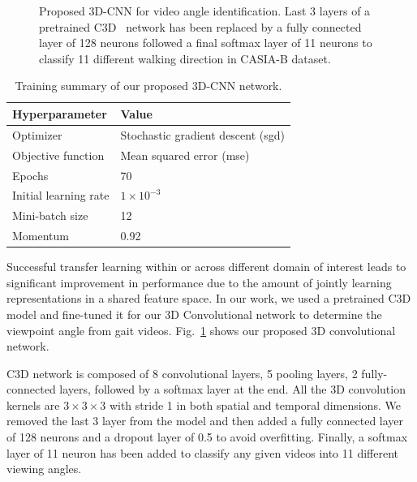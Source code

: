 \begin{figure}
	\caption{
		Proposed 3D-CNN for video angle identification. Last 3 layers of a pretrained C3D~\cite{Tran_15} network has been replaced by a fully connected layer of 128 neurons followed a final softmax layer of 11 neurons to classify 11 different walking direction in CASIA-B dataset.
	}
	\label{fig:3D_CNN}
\end{figure}

\begin{table}
	\centering
	\caption{Training summary of our proposed 3D-CNN network.  \label{table:summary_3dcnn}}
	\begin{tabular*}{30pc}{@{\extracolsep{\fill}}ll@{}}
			\hline \noalign{\vspace{3pt}}
			\textbf{Hyperparameter} & \textbf{Value} \\ \hline\noalign{\vspace{3pt}}
			Optimizer  &Stochastic gradient descent (\gls{sgd})  \\ [3pt]
			Objective function  &Mean squared error (\gls{mse}) \\ [3pt]
			Epochs  &70  \\ [3pt]
			Initial learning rate & $1 \times 10^{-3}$ \\ [3pt]
			Mini-batch size	  &12  \\ [3pt]
			Momentum  &0.92 \\ [3pt]
			\hline
	\end{tabular*}
\end{table}

Successful transfer learning within or across different domain of interest leads to significant improvement in performance due to the amount of jointly learning representations in a shared feature space. In our work, we used a pretrained C3D model and fine-tuned it for our 3D Convolutional network to determine the viewpoint angle from gait videos. Fig.~\ref{fig:3D_CNN} shows our proposed 3D convolutional network. 

C3D network is composed of 8 convolutional layers, 5 pooling layers, 2 fully-connected layers, followed by a softmax layer at the end. All the 3D convolution kernels are $3\times3\times3$ with stride 1 in both spatial and temporal dimensions. We removed the last 3 layer from the model and then added a fully connected layer of 128 neurons and a dropout layer of 0.5 to avoid overfitting. Finally, a softmax layer of 11 neuron has been added to classify any given videos into 11 different viewing angles. 


